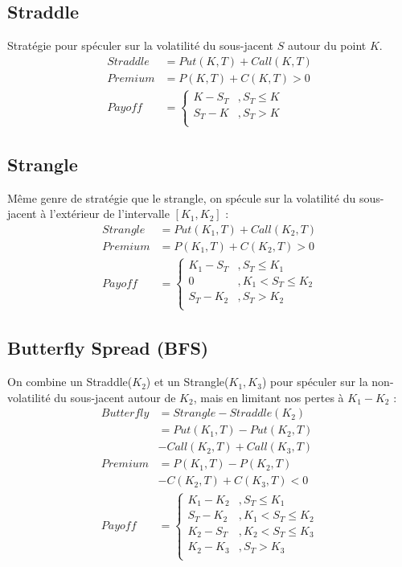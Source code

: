 \documentclass[10pt, french]{article}
\begin{document}
\begin{multicols*}{2}
\subsection*{Straddle}
Stratégie pour spéculer sur la volatilité du sous-jacent $S$ autour du point $K$.
\begin{align*}
Straddle			& = Put(K,T) + Call(K,T) \\
Premium			& = P(K,T) + C(K,T) > 0 \\
Payoff				& =
\begin{cases}
K - S_T				& , S_T \leq K \\
S_T - K				& , S_T > K \\
\end{cases}
\end{align*}


\subsection*{Strangle}
Même genre de stratégie que le strangle, on spécule sur la volatilité du sous-jacent à l'extérieur de l'intervalle $[K_1, K_2]$ :
\begin{align*}
Strangle			& = Put(K_1, T) + Call(K_2, T) \\
Premium			& = P(K_1, T) + C(K_2, T) > 0 \\
Payoff				& =
\begin{cases}
K_1 - S_T			& , S_T \leq K_1 \\
0						& , K_1 < S_T \leq K_2 \\
S_T - K_2 		& , S_T > K_2 \\
\end{cases}
\end{align*}



\subsection*{Butterfly Spread (BFS)}
On combine un Straddle($K_2$) et un Strangle($K_1, K_3$) pour spéculer sur la non-volatilité du sous-jacent autour de $K_2$, mais en limitant nos pertes à $K_1 - K_2$ :
\begin{align*}
Butterfly  & = Strangle - Straddle(K_2) \\
& = Put(K_1, T) - Put(K_2, T) \\
& - Call(K_2, T) + Call(K_3,T) \\
Premium	& = P(K_1, T) - P(K_2, T) \\
& - C(K_2, T) + C(K_3, T) < 0\\
Payoff		& =
\begin{cases}
K_1 - K_2			& , S_T \leq K_1 \\
S_T - K_2			& , K_1 < S_T \leq K_2 \\
K_2 - S_T			& , K_2 < S_T \leq K_3 \\
K_2 - K_3			& , S_T > K_3 \\
\end{cases}
\end{align*}

\end{multicols*}
\end{document}

